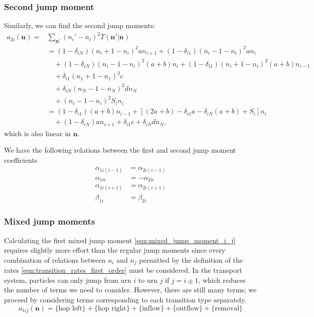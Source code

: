 \documentclass[a4paper,11pt]{article}
\numberwithin{equation}{section}
\newcommand{\V}[1]{\mathbf{#1}}
\begin{document}
\subsubsection{Second jump moment}
Similarly, we can find the second jump moments:
\begin{equation}
    \begin{aligned}
        a_{2i}(\V{n}) =& \sum_{\V{n}'} (n_i' - n_i)^2 T(\V{n}' | \V{n})\\
        &= (1-\delta_{iN})(n_i + 1 - n_i)^2a n_{i+1}
        +  (1-\delta_{i1})(n_i - 1 - n_i)^2a n_i\\
        &\quad+ (1-\delta_{iN})(n_i - 1 - n_i)^2(a+b) n_i
        +  (1-\delta_{i1})(n_i + 1 - n_i)^2(a+b) n_{i-1}\\
        &\quad+ \delta_{i1}(n_1 + 1 - n_1)^2 c\\
        &\quad+ \delta_{iN}(n_N - 1 - n_N)^2 d n_N\\
        &\quad+ (n_i - 1 - n_i)^2 S_i n_i\\
        &= (1-\delta_{i1})(a+b)n_{i-1} + \left[(2a+b) - \delta_{i1}a -
        \delta_{iN}(a+b) + S_i\right]n_i\\
        &\quad+ (1-\delta_{iN})an_{i+1} + \delta_{i1}c + \delta_{iN}d n_N,
    \end{aligned}
    \label{eqn:second_jump_mom_first_order}
\end{equation}
which is also linear in \(\V{n}\).

We have the following relations between the first and second jump moment
coefficients
\begin{align*}
    \alpha_{1i(i-1)} &= \alpha_{2i(i-1)}\\
    \alpha_{1ii} &= -\alpha_{2ii}\\
    \alpha_{1i(i+1)} &= \alpha_{2i(i+1)}\\
    \beta_{1i} &= \beta_{2i}
\end{align*}

\subsubsection{Mixed jump moments}
Calculating the first mixed jump moment \eqref{eqn:mixed_jump_moment_i_j}
requires slightly more effort than the regular jump moments since every
combination of relations between \(n_i\) and \(n_j\) permitted by the definition
of the rates \eqref{eqn:transition_rates_first_order} must be considered. In the
transport system, particles can only jump from urn \(i\) to urn \(j\) if \(j = i
\pm 1\), which reduces the number of terms we need to consider. However, there
are still many terms; we proceed by considering terms corresponding to each
transition type separately.
\begin{equation}
    a_{1ij}(\V{n}) = \{\text{hop left}\} + \{\text{hop right}\} +
    \{\text{inflow}\} + \{\text{outflow}\} + \{\text{removal}\}
\end{equation}
\end{document}
